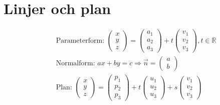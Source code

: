 \newpage

\section{Linjer och plan}
\begin{align*} 
  &\quad  \text{Parameterform: }
  \begin{pmatrix} x \\ y \\ z \end{pmatrix} =
  \begin{pmatrix} a_1 \\ a_2 \\ a_3 \end{pmatrix} +
  t\begin{pmatrix} v_1 \\ v_2 \\ v_3 \end{pmatrix}, t \in\mathbb{R} \\
  &\quad  \text{Normalform: } ax+by=c \Rightarrow
  \vec{n} = \begin{pmatrix} a \\ b \end{pmatrix} \\
  &\quad  \text{Plan: }
  \begin{pmatrix} x \\ y \\ z \end{pmatrix} =
  \begin{pmatrix} p_1 \\ p_2 \\ p_3 \end{pmatrix} +
  t\begin{pmatrix} u_1 \\ u_2 \\ u_3 \end{pmatrix} +
  s\begin{pmatrix} v_1 \\ v_2 \\ v_3 \end{pmatrix} \\
\end{align*}


